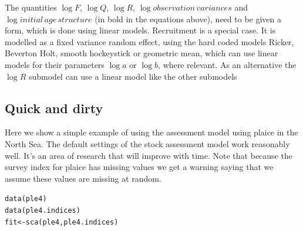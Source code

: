 \documentclass[a4paper,english,10pt]{article}\usepackage[]{graphicx}\usepackage[]{color}
\makeatletter
\newcommand{\hlstd}[1]{\textcolor[rgb]{0,0,0}{#1}}%
\newcommand{\hlkwb}[1]{\textcolor[rgb]{0.361,0.506,0.596}{#1}}%
\newcommand{\hlkwd}[1]{\textcolor[rgb]{0.361,0.506,0.596}{#1}}%
\newenvironment{kframe}{%
 \def\at@end@of@kframe{}%
 \ifinner\ifhmode%
  \def\at@end@of@kframe{\end{minipage}}%
  \begin{minipage}{\columnwidth}%
 \fi\fi%
 \def\FrameCommand##1{\hskip\@totalleftmargin \hskip-\fboxsep
 \colorbox{shadecolor}{##1}\hskip-\fboxsep
     \hskip-\linewidth \hskip-\@totalleftmargin \hskip\columnwidth}%
 \MakeFramed {\advance\hsize-\width
   \@totalleftmargin\z@ \linewidth\hsize
   \@setminipage}}%
 {\par\unskip\endMakeFramed%
 \at@end@of@kframe}
\newenvironment{knitrout}{}{} %
\makeatother
\begin{document}
The quantities $\log{F}$, $\log{Q}$, $\log{R}$, $\log{observation\,variances}$ and $\log{ initial\,age\,structure}$ (in bold in the equations above), need to be given a form, which is done using linear models. Recruitment is a special case. It is modelled as a fixed variance random effect, using the hard coded models Ricker, Beverton Holt, smooth hockeystick or geometric mean, which can use linear models for their parameters $\log{a}$ or $\log{b}$, where relevant. As an alternative the $\log{R}$ submodel can use a linear model like the other submodels 

\subsection{Quick and dirty}

Here we show a simple example of using the assessment model using plaice in the North Sea. The default settings of the stock assessment model work reasonably well. It's an area of research that will improve with time. Note that because the survey index for plaice has missing values we get a warning saying that we assume these values are missing at random.

\begin{knitrout}
\color{fgcolor}\begin{kframe}
\begin{alltt}
\hlkwd{data}\hlstd{(ple4)}
\hlkwd{data}\hlstd{(ple4.indices)}
\hlstd{fit} \hlkwb{<-} \hlkwd{sca}\hlstd{(ple4, ple4.indices)}
\end{alltt}


{\ttfamily\noindent\itshape\color{messagecolor}{\#\# Note: The following observations are treated as being missing at random:\\\#\# 	\ \ \ \ \ \  fleet year age\\\#\# 	\ \ \ \ BTS-Isis 1997\ \  1\\\#\# 	\ \ \ \ BTS-Isis 1997\ \  2\\\#\# 	 BTS-Tridens 1997\ \  1\\\#\# 	 BTS-Tridens 1997\ \  2\\\#\# 	\ \ \ \ \ \ \ \  SNS 1997\ \  1\\\#\# 	\ \ \ \ \ \ \ \  SNS 1997\ \  2\\\#\# 	\ \ \ \ \ \ \ \  SNS 2003\ \  1\\\#\# 	\ \ \ \ \ \ \ \  SNS 2003\ \  2\\\#\# 	\ \ \ \ \ \ \ \  SNS 2003\ \  3\\\#\#\ \ \ \ \ \  Predictions will be made for missing observations.}}\end{kframe}
\end{knitrout}
\end{document}
